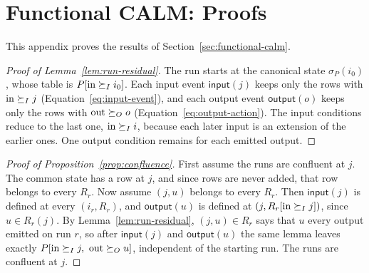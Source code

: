 \section{Functional CALM: Proofs}
\label{app:proofs-sec2}

This appendix proves the results of Section~\ref{sec:functional-calm}.

\begin{proof}[Proof of Lemma~\ref{lem:run-residual}]
The run starts at the canonical state $\sigma_P(i_0)$, whose table is
$P[\mathrm{in}\succeq_I i_0]$. Each input event $\mathsf{input}(j)$ keeps only
the rows with $\mathrm{in}\succeq_I j$ (Equation~\ref{eq:input-event}), and each
output event $\mathsf{output}(o)$ keeps only the rows with
$\mathrm{out}\succeq_O o$ (Equation~\ref{eq:output-action}). The input
conditions reduce to the last one, $\mathrm{in}\succeq_I i$, because each later
input is an extension of the earlier ones. One output condition remains for each
emitted output.
\end{proof}

\begin{proof}[Proof of Proposition~\ref{prop:confluence}]
First assume the runs are confluent at $j$.  The common state has a row at
$j$, and since rows are never added, that row belongs to every $R_r$.  Now
assume $(j,u)$ belongs to every $R_r$.  Then $\mathsf{input}(j)$ is defined at
every $(i_r,R_r)$, and $\mathsf{output}(u)$ is defined at
$(j,R_r[\mathrm{in}\succeq_I j])$, since $u\in R_r(j)$.  By
Lemma~\ref{lem:run-residual}, $(j,u)\in R_r$ says that $u$ \outrel every output
emitted on run $r$, so after $\mathsf{input}(j)$ and $\mathsf{output}(u)$ the
same lemma leaves exactly
$P[\mathrm{in}\succeq_I j,\ \mathrm{out}\succeq_O u]$, independent of the
starting run.  The runs are confluent at $j$.
\end{proof}

